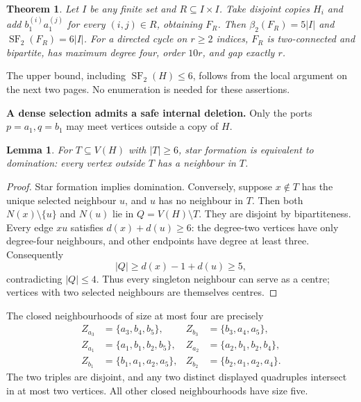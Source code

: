 \documentclass[11pt]{article}
\newtheorem{theorem}{Theorem}
\newtheorem{lemma}{Lemma}
\newcommand{\SF}{\operatorname{SF}_2}
\newcommand{\bb}{\beta_2}
\begin{document}
\begin{theorem}
Let $I$ be any finite set and $R\subseteq I\times I$. Take disjoint copies
$H_i$ and add $b_1^{(i)}a_1^{(j)}$ for every $(i,j)\in R$, obtaining $F_R$.
Then $\bb(F_R)=5|I|$ and $\SF(F_R)=6|I|$.
For a directed cycle on $r\ge2$ indices, $F_R$ is two-connected and
bipartite, has maximum degree four, order $10r$, and gap exactly $r$.
\end{theorem}
The upper bound, including $\SF(H)\le6$, follows from the local argument
on the next two pages. No enumeration is needed for these assertions.

\newpage
\textbf{A dense selection admits a safe internal deletion.}
Only the ports $p=a_1,q=b_1$ may meet vertices outside a copy of $H$.

\begin{lemma}
For $T\subseteq V(H)$ with $|T|\ge6$, star formation is equivalent to
domination: every vertex outside $T$ has a neighbour in $T$.
\end{lemma}
\begin{proof}
Star formation implies domination. Conversely, suppose $x\notin T$ has
the unique selected neighbour $u$, and $u$ has no neighbour in $T$. Then
both $N(x)\setminus\{u\}$ and $N(u)$ lie in $Q=V(H)\setminus T$.
They are disjoint by bipartiteness. Every edge $xu$ satisfies
$d(x)+d(u)\ge6$: the degree-two vertices have only degree-four neighbours,
and other endpoints have degree at least three. Consequently
\[
 |Q|\ge d(x)-1+d(u)\ge5,
\]
contradicting $|Q|\le4$. Thus every singleton neighbour can serve as a
centre; vertices with two selected neighbours are themselves centres.
\end{proof}

The closed neighbourhoods of size at most four are precisely
\begin{align*}
 Z_{a_3}&=\{a_3,b_4,b_5\},& Z_{b_3}&=\{b_3,a_4,a_5\},\\
 Z_{a_1}&=\{a_1,b_1,b_2,b_5\},& Z_{a_2}&=\{a_2,b_1,b_2,b_4\},\\
 Z_{b_1}&=\{b_1,a_1,a_2,a_5\},& Z_{b_2}&=\{b_2,a_1,a_2,a_4\}.
\end{align*}
The two triples are disjoint, and any two distinct displayed quadruples
intersect in at most two vertices. All other closed neighbourhoods have
size five.
\end{document}
